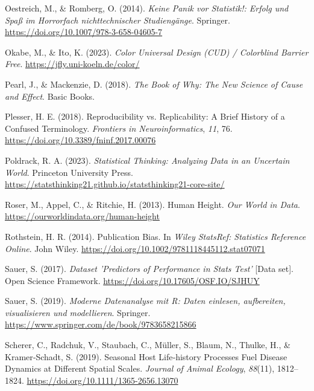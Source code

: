 \documentclass[
  letterpaper,
  twoside,
  open=any]{scrbook}
\newlength{\cslhangindent}
\newenvironment{CSLReferences}[2] %
 {\begin{list}{}{%
  \setlength{\itemindent}{0pt}
  \setlength{\leftmargin}{0pt}
  \setlength{\parsep}{0pt}
  \ifodd #1
   \setlength{\leftmargin}{\cslhangindent}
   \setlength{\itemindent}{-1\cslhangindent}
  \fi
  \setlength{\itemsep}{#2\baselineskip}}}
 {\end{list}}
\theoremstyle{definition}
\theoremstyle{definition}
\theoremstyle{definition}
\theoremstyle{remark}
\begin{document}
\begin{CSLReferences}{1}{0}
Oestreich, M., \& Romberg, O. (2014). \emph{Keine Panik vor Statistik!:
Erfolg und Spaß im Horrorfach nichttechnischer Studiengänge}. Springer.
\url{https://doi.org/10.1007/978-3-658-04605-7}

Okabe, M., \& Ito, K. (2023). \emph{Color {Universal Design} ({CUD}) /
{Colorblind Barrier Free}}. \url{https://jfly.uni-koeln.de/color/}

Pearl, J., \& Mackenzie, D. (2018). \emph{The Book of Why: The New
Science of Cause and Effect}. Basic Books.

Plesser, H. E. (2018). Reproducibility vs. {Replicability}: {A Brief
History} of a {Confused Terminology}. \emph{Frontiers in
Neuroinformatics}, \emph{11}, 76.
\url{https://doi.org/10.3389/fninf.2017.00076}

Poldrack, R. A. (2023). \emph{Statistical Thinking: Analyzing Data in an
Uncertain World}. Princeton University Press.
\url{https://statsthinking21.github.io/statsthinking21-core-site/}

Roser, M., Appel, C., \& Ritchie, H. (2013). Human Height. \emph{Our
World in Data}. \url{https://ourworldindata.org/human-height}

Rothstein, H. R. (2014). Publication {Bias}. In \emph{Wiley {StatsRef}:
{Statistics Reference Online}}. John Wiley.
\url{https://doi.org/10.1002/9781118445112.stat07071}

Sauer, S. (2017). \emph{Dataset 'Predictors of Performance in Stats
Test'} {[}Data set{]}. Open Science Framework.
\url{https://doi.org/10.17605/OSF.IO/SJHUY}

Sauer, S. (2019). \emph{Moderne Datenanalyse mit R: Daten einlesen,
aufbereiten, visualisieren und modellieren}. Springer.
\url{https://www.springer.com/de/book/9783658215866}

Scherer, C., Radchuk, V., Staubach, C., Müller, S., Blaum, N., Thulke,
H., \& Kramer‐Schadt, S. (2019). Seasonal Host Life‐history Processes
Fuel Disease Dynamics at Different Spatial Scales. \emph{Journal of
Animal Ecology}, \emph{88}(11), 1812--1824.
\url{https://doi.org/10.1111/1365-2656.13070}


\end{CSLReferences}
\end{document}
